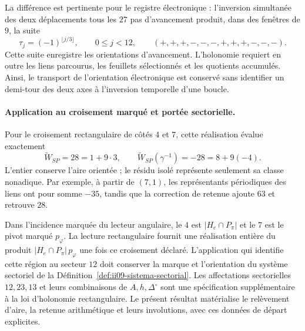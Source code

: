 La différence est pertinente pour le registre électronique : l'inversion
simultanée des deux déplacements tous les $27$ pas d'avancement produit, dans
des fenêtres de $9$, la suite
\[
 \tau_j=(-1)^{\lfloor j/3\rfloor},\qquad 0\leq j<12,
 \qquad (+,+,+,-,-,-,+,+,+,-,-,-).
\]
Cette suite enregistre les orientations d'avancement. L'holonomie requiert
en outre les liens parcourus, les feuillets sélectionnés et les quotients
accumulés. Ainsi, le transport de l'orientation électronique est conservé
sans identifier un demi-tour des deux axes à l'inversion temporelle
d'une boucle.

\paragraph{Application au croisement marqué et portée sectorielle.}
Pour le croisement rectangulaire de côtés $4$ et $7$, cette réalisation évalue
exactement
\[
 \widetilde W_{SP}=28=1+9\cdot3,\qquad
 \widetilde W_{SP}(\gamma^{-1})=-28=8+9(-4).
\]
L’entier conserve l’aire orientée ; le résidu isolé représente seulement
sa classe nonadique. Par exemple, à partir de $(7,1)$, les représentants
périodiques des liens ont pour somme $-35$, tandis que la correction de
retenue ajoute $63$ et retrouve $28$.

Dans l'incidence marquée du lecteur angulaire, le $4$ est
$|H_e\cap P_\pi|$ et le $7$ est le pivot marqué $p_\varphi$.
La lecture rectangulaire fournit une réalisation entière du produit
$|H_e\cap P_\pi|\,p_\varphi$ une fois ce croisement déclaré.
L'application qui identifie cette région au secteur $12$ doit conserver
la marque et l'orientation du système sectoriel de
la Définition~\ref{def:ii09-sistema-sectorial}. Les affectations
sectorielles $12,23,13$ et leurs combinaisons de $A,h,\Delta^\circ$
sont une spécification supplémentaire à la loi d'holonomie rectangulaire.
Le présent résultat matérialise le relèvement d'aire, la retenue arithmétique et
leurs involutions, avec ces données de départ explicites.
